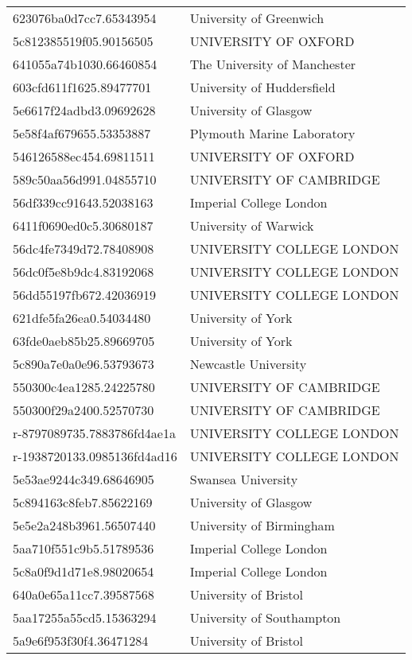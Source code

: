 \begin{tabular}{ll}
623076ba0d7cc7.65343954 & University of Greenwich \\
5c812385519f05.90156505 & UNIVERSITY OF OXFORD \\
641055a74b1030.66460854 & The University of Manchester \\
603cfd611f1625.89477701 & University of Huddersfield \\
5e6617f24adbd3.09692628 & University of Glasgow \\
5e58f4af679655.53353887 & Plymouth Marine Laboratory \\
546126588ec454.69811511 & UNIVERSITY OF OXFORD \\
589c50aa56d991.04855710 & UNIVERSITY OF CAMBRIDGE \\
56df339cc91643.52038163 & Imperial College London \\
6411f0690ed0c5.30680187 & University of Warwick \\
56dc4fe7349d72.78408908 & UNIVERSITY COLLEGE LONDON \\
56dc0f5e8b9dc4.83192068 & UNIVERSITY COLLEGE LONDON \\
56dd55197fb672.42036919 & UNIVERSITY COLLEGE LONDON \\
621dfe5fa26ea0.54034480 & University of York \\
63fde0aeb85b25.89669705 & University of York \\
5c890a7e0a0e96.53793673 & Newcastle University \\
550300c4ea1285.24225780 & UNIVERSITY OF CAMBRIDGE \\
550300f29a2400.52570730 & UNIVERSITY OF CAMBRIDGE \\
r-8797089735.7883786fd4ae1a & UNIVERSITY COLLEGE LONDON \\
r-1938720133.0985136fd4ad16 & UNIVERSITY COLLEGE LONDON \\
5e53ae9244c349.68646905 & Swansea University \\
5c894163c8feb7.85622169 & University of Glasgow \\
5e5e2a248b3961.56507440 & University of Birmingham \\
5aa710f551c9b5.51789536 & Imperial College London \\
5c8a0f9d1d71e8.98020654 & Imperial College London \\
640a0e65a11cc7.39587568 & University of Bristol \\
5aa17255a55cd5.15363294 & University of Southampton \\
5a9e6f953f30f4.36471284 & University of Bristol \\

\end{tabular}
